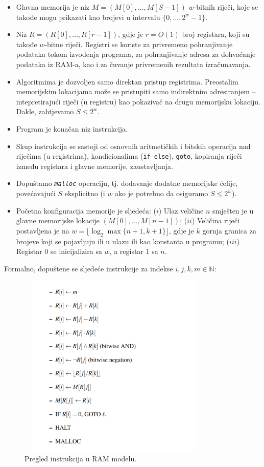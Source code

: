 \begin{itemize}
	\item Glavna memorija je niz $M = (M[0], \ldots, M[S-1])$  $w$-bitnih riječi, koje se takođe mogu prikazati kao brojevi u intervalu
 $\{0,\ldots , 2^w - 1\}$.
 	\item Niz $R = (R[0], \ldots , R[r - 1])$,  gdje je $r = O(1)$ broj registara, koji su takođe $w$-bitne riječi. Registri se koriste za privremeno pohranjivanje podataka tokom izvođenja programa, za pohranjivanje adresa za dohvaćanje podataka iz RAM-a, kao i za čuvanje privremenih rezultata izračunavanja. 
 	
 	\item Algoritmima je dozvoljen samo direktan pristup registrima. Preostalim memorijskim lokacijama može se pristupiti samo
 	indirektnim adresiranjem -- intepretirajući riječi (u registru) kao pokazivač na drugu memorijsku lokaciju. Dakle, zahtjevamo
 	$S \leq  2^w$.
 	\item Program je konačan niz instrukcija.
 	\item Skup instrukcija se sastoji od osnovnih aritmetičkih i bitskih operacija nad riječima (u registrima), kondicionalima
 	(\texttt{if}--\texttt{else}), \texttt{goto}, kopiranja riječi između registara i glavne memorije, zaustavljanja.
 	\item Dopuštamo \texttt{\textit{malloc}} operaciju, tj. dodavanje dodatne memorijske ćelije, povećavajući $S$ eksplicitno (i $w$ ako je potrebno da osiguramo $S \leq 2^w$).
 	\item Početna konfiguracija memorije je sljedeća:
 	($i$) Ulaz veličine $n$ smješten je u glavne memorijske lokacije $(M[0],\ldots , M[n - 1])$; ($ii$) Veličina riječi postavljena je na $w = \lfloor \log_2 \max\{n + 1, k + 1\} \rfloor $, gdje je $k$ gornja granica za brojeve koji se
 	pojavljuju ili u ulazu ili kao konstanta u programu; ($iii$) Registar 0 se inicijalizira sa $w$, a registar 1 sa $n$.
 \end{itemize}

Formalno, dopuštene se sljedeće instrukcije za indekse $i, j, k, m \in \mathbb{N} $:

\begin{figure}[H]
	\centering
	\includegraphics[width=260pt,height=250pt]{slike/instructions_ram.png}

	\caption{Pregled instrukcija u RAM modelu.}	\label{fig: ram_instructions}
\end{figure}

